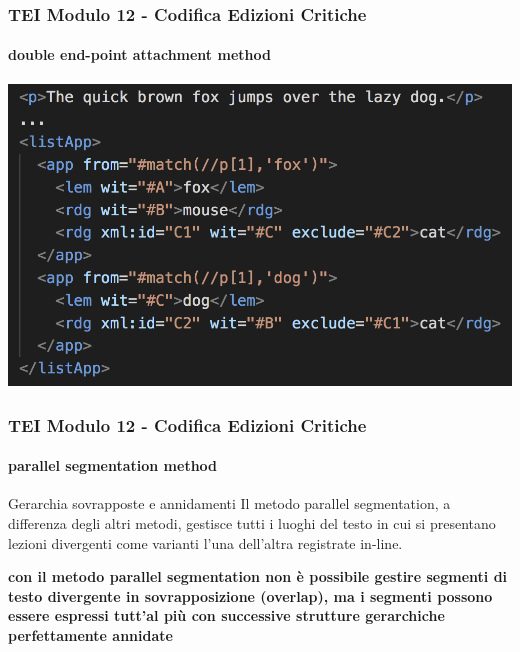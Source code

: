 \begin{frame}
    \frametitle{TEI Modulo 12 - Codifica Edizioni Critiche}
    \framesubtitle{double end-point attachment method}
    \addtocounter{nframe}{1}
    
   
    \begin{center}
       \includegraphics[width=.95\textwidth]{imgs/indirected-standoff-app.png}
    \end{center}

\end{frame}




\begin{frame}
    \frametitle{TEI Modulo 12 - Codifica Edizioni Critiche}
    \framesubtitle{parallel segmentation method}
    \addtocounter{nframe}{1}
    






    \begin{block}{Gerarchia sovrapposte e annidamenti}
      Il metodo parallel segmentation, a differenza degli altri metodi, gestisce tutti i luoghi del testo in cui si presentano lezioni divergenti come varianti l'una dell'altra registrate in-line.
    \end{block}

    \textbf{con il metodo parallel segmentation non è possibile gestire segmenti di testo divergente in sovrapposizione (overlap), ma i segmenti possono essere espressi tutt'al più con successive strutture gerarchiche perfettamente annidate}

\end{frame}

